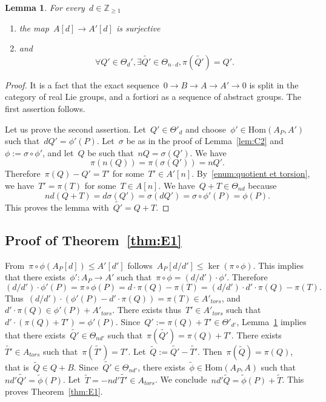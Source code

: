 \documentclass[12pt]{amsart}
\newtheorem{lemma}[theorem]{Lemma}
\newcommand{\Hom}{\mbox{Hom}}
\newcommand{\Z}{{\mathbb Z}}
\newcommand{\wt}[1]{{\widetilde{#1}}}
\begin{document}
\begin{lemma}\label{lem:C3}
For every~$d\in\Z_{\geq1}$
\begin{enumerate}
\item the map~$A[d]\to A'[d]$ is surjective \label{enum:quotient et torsion}
\item \label{enum:2}
and
\[
\forall Q'\in\Theta_d', \exists \widetilde{Q'}\in \Theta_{n\cdot d}, \pi(\widetilde{Q'})=Q'. 
\]
\end{enumerate}
\end{lemma}
\begin{proof}It is a fact that the exact sequence~$0\to B\to A\to A'\to 0$ is split in the category 
of real Lie groups, and a fortiori as a sequence of abstract groups. The first assertion follows.

Let us prove the second assertion. Let~$Q'\in \Theta'_{d}$ and choose~$\phi'\in \Hom(A_P,A')$ such that~$d Q'=\phi'(P)$. Let~$\sigma$ be as in the proof of Lemma~\ref{lem:C2} and~$\phi:=\sigma\circ \phi'$, and let~$Q$ be such that~$nQ=\sigma(Q')$. 
We have
\[
\pi(n(Q))=\pi(\sigma(Q'))=nQ'.
\]
Therefore~$\pi(Q)-Q'=T'$ for some~$T'\in A'[n]$. By~\eqref{enum:quotient et torsion}, we have~$T'=\pi(T)$ for some~$T\in A[n]$. We have~$Q+T\in \Theta_{nd}$ because
\[
nd (Q+T)=d\sigma(Q')=\sigma(dQ')= \sigma\circ \phi'(P)=\phi(P).
\]
This proves the lemma with~$\wt{Q'}=Q+T$.
\end{proof}
\subsection{Proof of Theorem~\ref{thm:E1}}

From~$\pi\circ \phi(A_P[d])\leq A'[d']$ follows~$A_P[d/d']\leq \ker(\pi\circ \phi)$. This implies that there exists~$\phi':A_P\to A'$ such that~$\pi \circ \phi=(d/d')\cdot \phi'$. Therefore
\[
(d/d')\cdot \phi'(P)=\pi\circ \phi(P)=d\cdot \pi(Q)-\pi(T)=(d/d')\cdot d'\cdot \pi(Q)-\pi(T).
\]
Thus~$(d/d')\cdot (\phi'(P)-d'\cdot \pi(Q))=\pi(T)\in A'_{tors}$, and~$d'\cdot \pi(Q)\in \phi'(P)+A'_{tors}$. There exists thus~$T'\in A'_{tors}$ such that~$d'\cdot (\pi(Q)+T')=\phi'(P)$. Since~$Q':=\pi(Q)+T'\in \Theta'_{d'}$, Lemma~\ref{lem:C3} implies that there exists~$\wt{Q'}\in \Theta_{nd'}$ such that~$\pi(\wt{Q'})=\pi(Q)+T'$. There exists~$\wt{T'}\in A_{tors}$ such that~$\pi(\wt{T'})=T'$. 
Let~$\wt{Q}:=\wt{Q'}-\wt{T'}$. Then~$\pi(\wt{Q})=\pi(Q)$, that is~$\wt{Q}\in Q+B$. Since~$\wt{Q'}\in \Theta_{nd'}$, there exists~$\wt{\phi}\in \Hom(A_P,A)$ such that~$nd'\wt{Q'}=\wt{\phi}(P)$. Let~$\wt{T}=-nd'\wt{T'}\in A_{tors}$. We conclude~$nd'\wt{Q}=\wt{\phi}(P)+\wt{T}$. This proves Theorem~\ref{thm:E1}.
\end{document}
